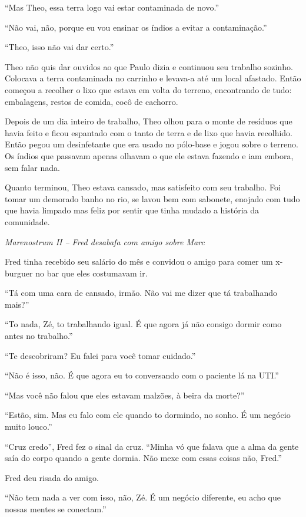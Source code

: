 ``Mas Theo, essa terra logo vai estar contaminada de novo.''

``Não vai, não, porque eu vou ensinar os índios a evitar a
contaminação.''

``Theo, isso não vai dar certo.''

Theo não quis dar ouvidos ao que Paulo dizia e continuou seu trabalho
sozinho. Colocava a terra contaminada no carrinho e levava-a até um
local afastado. Então começou a recolher o lixo que estava em volta do
terreno, encontrando de tudo: embalagens, restos de comida, cocô de
cachorro.

Depois de um dia inteiro de trabalho, Theo olhou para o monte de
resíduos que havia feito e ficou espantado com o tanto de terra e de
lixo que havia recolhido. Então pegou um desinfetante que era usado no
pólo-base e jogou sobre o terreno. Os índios que passavam apenas olhavam
o que ele estava fazendo e iam embora, sem falar nada.

Quanto terminou, Theo estava cansado, mas satisfeito com seu trabalho.
Foi tomar um demorado banho no rio, se lavou bem com sabonete, enojado
com tudo que havia limpado mas feliz por sentir que tinha mudado a
história da comunidade.

\asterisc

\emph{Marenostrum II -- Fred desabafa com amigo sobre Marc}

Fred tinha recebido seu salário do mês e convidou o amigo para comer um
x-burguer no bar que eles costumavam ir.

``Tá com uma cara de cansado, irmão. Não vai me dizer que tá trabalhando
mais?''

``To nada, Zé, to trabalhando igual. É que agora já não consigo dormir
como antes no trabalho.''

``Te descobriram? Eu falei para você tomar cuidado.''

``Não é isso, não. É que agora eu to conversando com o paciente lá na
UTI.''

``Mas você não falou que eles estavam malzões, à beira da morte?''

``Estão, sim. Mas eu falo com ele quando to dormindo, no sonho. É um
negócio muito louco.''

``Cruz credo'', Fred fez o sinal da cruz. ``Minha vó que falava que a
alma da gente saía do corpo quando a gente dormia. Não mexe com essas
coisas não, Fred.''

Fred deu risada do amigo.

``Não tem nada a ver com isso, não, Zé. É um negócio diferente, eu acho
que nossas mentes se conectam.''

